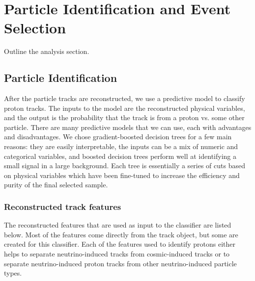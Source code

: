 \section{Particle Identification and Event Selection}\label{protonid}
\hspace{\parindent}
Outline the analysis section.

\subsection{Particle Identification}
  After the particle tracks are reconstructed, we use a predictive model to
  classify proton tracks. The inputs to the model are the reconstructed
  physical variables, and the output is the probability that the track is from
  a proton vs. some other particle. There are many predictive models that we
  can use, each with advantages and disadvantages. We chose gradient-boosted
  decision trees for a few main reasons: they are easily interpretable, the
  inputs can be a mix of numeric and categorical variables, and boosted
  decision trees perform well at identifying a small signal in a large
  background.  Each tree is essentially a series of cuts based on physical
  variables which have been fine-tuned to increase the efficiency and purity of
  the final selected sample.
  \subsubsection{Reconstructed track features}
    The reconstructed features that are used as input to the classifier are
    listed below. Most of the features come directly from the track object, but
    some are created for this classifier. Each of the features used to identify
    protons either helps to separate neutrino-induced tracks from
    cosmic-induced tracks or to separate neutrino-induced proton tracks from
    other neutrino-induced particle types.

